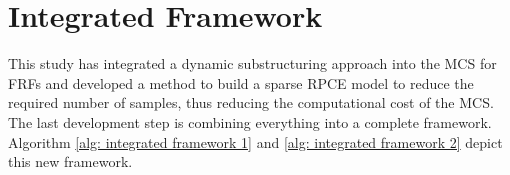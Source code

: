 \section{Integrated Framework}
\label{sec: integrated framework}

This study has integrated a dynamic substructuring approach into the MCS for FRFs and developed a method to build a sparse RPCE model to reduce the required number of samples, thus reducing the computational cost of the MCS.
The last development step is combining everything into a complete framework.
Algorithm \ref{alg: integrated framework 1} and \ref{alg: integrated framework 2} depict this new framework.

